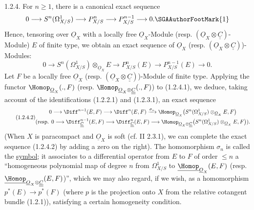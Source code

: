 1.2.4. For $n\ge1$, there is a canonical exact sequence
\[
  0\longrightarrow S^n(\Omega^1_{X/S})
  \longrightarrow P^n_{X/S}
  \longrightarrow P^{n-1}_{X/S}
  \longrightarrow 0.\text{\SGAAuthorFootMark{1}}
\]
%
Hence, tensoring over $\underline{O}_X$ with a locally free $\underline{O}_X$-Module (resp. $(\underline{O}_X\otimes\underline{\underline{C}})$-Module) $E$ of finite type, we obtain an exact sequence of $\underline{O}_X$ (resp. $(\underline{O}_X\otimes\underline{\underline{C}})$)-Modules:
\begin{equation}\tag{1.2.4.1}
  0\longrightarrow S^n(\Omega^1_{X/S})\otimes_{\underline{O}_X}E
  \longrightarrow P^n_{X/S}(E)
  \longrightarrow P^{n-1}_{X/S}(E)
  \longrightarrow 0.
\end{equation}
Let $F$ be a locally free $\underline{O}_X$ (resp. $(\underline{O}_X\otimes\underline{\underline{C}})$)-Module of finite type. Applying the functor $\Homop_{\underline{O}_X}(.,F)$ (resp. $\Homop_{\underline{O}_X\otimes\underline{\underline{C}}}(.,F)$) to (1.2.4.1), we deduce, taking account of the identifications (1.2.2.1) and (1.2.3.1), an exact sequence
\begin{equation}\tag{1.2.4.2}
\begin{gathered}
  0\longrightarrow \Diff^{n-1}(E,F)
  \longrightarrow \Diff^n(E,F)
  \xrightarrow{\sigma_n}
  \Homop_{\underline{O}_X}\bigl(S^n(\Omega^1_{X/S})\otimes_{\underline{O}_X}E,F\bigr)\\
  (\text{resp. } 0\longrightarrow \Diff^{n-1}_{\underline{\underline{C}}}(E,F)
  \longrightarrow \Diff^n_{\underline{\underline{C}}}(E,F)
  \longrightarrow
  \Homop_{\underline{O}_X\otimes\underline{\underline{C}}}\bigl(S^n(\Omega^1_{X/S})\otimes_{\underline{O}_X}E,F\bigr)).
\end{gathered}
\end{equation}
%
(When $X$ is paracompact and $\underline{O}_X$ is soft (cf. II 2.3.1), we can complete the exact sequence (1.2.4.2) by adding a zero on the right). The homomorphism $\sigma_n$ is called the \uline{symbol}; it associates to a differential operator from $E$ to $F$ of order $\le n$ a \textquotedblleft homogeneous polynomial map of degree $n$ from $\Omega^1_{X/S}$ to $\underline{\Homop}_{\underline{O}_X}(E,F)$ (resp. $\underline{\Homop}_{\underline{O}_X\otimes\underline{\underline{C}}}(E,F)$)\textquotedblright, which we may also regard, if we wish, as a homomorphism $p^*(E)\longrightarrow p^*(F)$ (where $p$ is the projection onto $X$ from the relative cotangent bundle (1.2.1)), satisfying a certain homogeneity condition.

